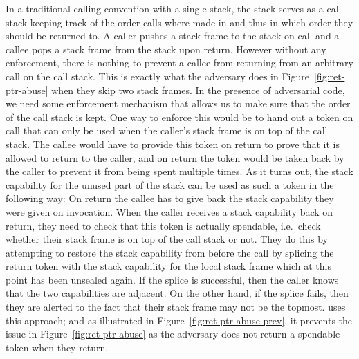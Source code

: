 \documentclass[acmsmall,review,showframe]{acmart}\settopmatter{printfolios=true,printccs=false,printacmref=false}
\begin{document}
In a traditional calling convention with a single stack, the stack serves as a call stack keeping track of the order calls where made in and thus in which order they should be returned to.
A caller pushes a stack frame to the stack on call and a callee pops a stack frame from the stack upon return.
However without any enforcement, there is nothing to prevent a callee from returning from an arbitrary call on the call stack.
This is exactly what the adversary does in Figure~\ref{fig:ret-ptr-abuse} when they skip two stack frames.
In the presence of adversarial code, we need some enforcement mechanism that allows us to make sure that the order of the call stack is kept.
One way to enforce this would be to hand out a token on call that can only be used when the caller's stack frame is on top of the call stack.
The callee would have to provide this token on return to prove that it is allowed to return to the caller, and on return the token would be taken back by the caller to prevent it from being spent multiple times.
As it turns out, the stack capability for the unused part of the stack can be used as such a token in the following way:
On return the callee has to give back the stack capability they were given on invocation.
When the caller receives a stack capability back on return, they need to check that this token is actually spendable, i.e.\ check whether their stack frame is on top of the call stack or not.
They do this by attempting to restore the stack capability from before the call by splicing the return token with the stack capability for the local stack frame which at this point has been unsealed again.
If the splice is successful, then the caller knows that the two capabilities are adjacent. On the other hand, if the splice fails, then they are alerted to the fact that their stack frame may not be the topmost.
\stktokens{} uses this approach; and as illustrated in Figure~\ref{fig:ret-ptr-abuse-prev}, it prevents the issue in Figure~\ref{fig:ret-ptr-abuse} as the adversary does not return a spendable token when they return.
\end{document}
